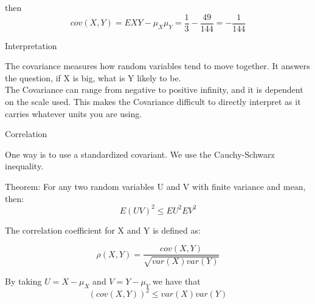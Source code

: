 \documentclass{report}
\begin{document}
\begin{description}
\begin{mdframed}
            then
            \begin{displaymath}
                cov(X,Y) = EXY - \mu_X \mu_Y
                = \frac{1}{3} - \frac{49}{144} = -\frac{1}{144}
            \end{displaymath}
        \end{mdframed}
    \item {\large Interpretation} 
        \begin{mdframed}
            The covariance measures how random variables tend to
            move together. It answers the question, if X is big,
            what is Y likely to be.
            \\
            The Covariance can range from negative to positive
            infinity, and it is dependent on the scale used. This
            makes the Covariance difficult to directly interpret
            as it carries whatever units you are using.
        \end{mdframed}
        \pagebreak
    \item {\large Correlation} 
        \begin{mdframed}
            One way is to use a standardized covariant. We
            use the Cauchy-Schwarz inequality.

            \vspace{10}
            \begin{mdframed}
                Theorem: For any two random variables U and V 
                with finite variance and mean, then:
                \begin{displaymath}
                    E(UV)^2 \le EU^2 EV^2
                \end{displaymath}
            \end{mdframed}

            The correlation coefficient for X and Y is defined
            as:

            \begin{displaymath}
                \rho(X,Y) = \frac{cov(X,Y)}{\sqrt{var(X) var(Y)}}
            \end{displaymath}
            
            By taking $U = X - \mu_X$ and  $V = Y - \mu_Y$ we
            have that 
             \begin{displaymath}
                (cov(X,Y))^2 \le var(X)var(Y)
            \end{displaymath}
            

\end{mdframed}
\end{description}
\end{document}
